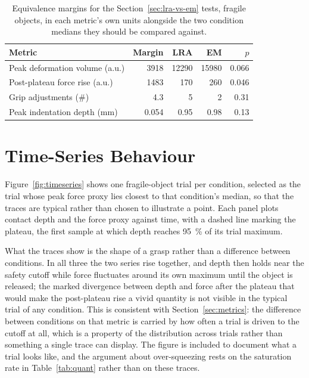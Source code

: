 \documentclass[12pt, a4paper, twoside, openright]{report}
\begin{document}
\begin{table}[ht]
    \centering
    \caption{Equivalence margins for the Section~\ref{sec:lra-vs-em} tests,
        fragile objects, in each metric's own units alongside the two condition
        medians they should be compared against.}
    \label{tab:tost}
    \begin{tabular}{@{}lrrrr@{}}
        \toprule
        Metric                         & Margin & LRA   & EM    & $p$   \\
        \midrule
        Peak deformation volume (a.u.) & 3918   & 12290 & 15980 & 0.066 \\
        Post-plateau force rise (a.u.) & 1483   & 170   & 260   & 0.046 \\
        Grip adjustments (\#)          & 4.3    & 5     & 2     & 0.31  \\
        Peak indentation depth (mm)    & 0.054  & 0.95  & 0.98  & 0.13  \\
        \bottomrule
    \end{tabular}
\end{table}

\section{Time-Series Behaviour}
\label{sec:timeseries}

Figure~\ref{fig:timeseries} shows one fragile-object trial per condition,
selected as the trial whose peak force proxy lies closest to that condition's
median, so that the traces are typical rather than chosen to illustrate a
point. Each panel plots contact depth and the force proxy against time, with a
dashed line marking the plateau, the first sample at which depth reaches
\SI{95}{\percent} of its trial maximum.

What the traces show is the shape of a grasp rather than a difference between
conditions. In all three the two series rise together, and depth then holds
near the safety cutoff while force fluctuates around its own maximum until the
object is released; the marked divergence between depth and force after the
plateau that would make the post-plateau rise a vivid quantity is not visible
in the typical trial of any condition. This is consistent with
Section~\ref{sec:metrics}: the difference between conditions on that metric is
carried by how often a trial is driven to the cutoff at all, which is a
property of the distribution across trials rather than something a single
trace can display. The figure is included to document what a trial looks like,
and the argument about over-squeezing rests on the saturation rate in
Table~\ref{tab:quant} rather than on these traces.
\end{document}
